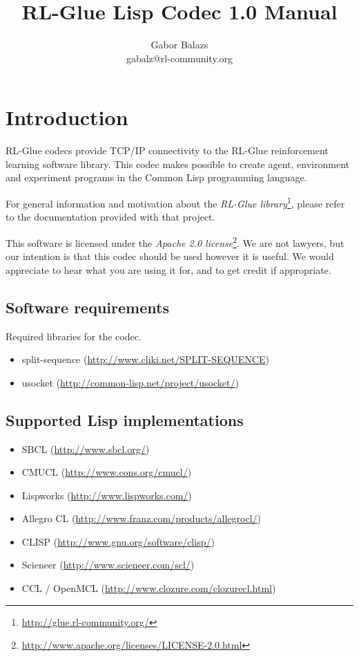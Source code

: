 \documentclass[11pt,a4paper,dvipdfm]{article}
\newcommand{\selfref}[1]{\href{#1}{#1}}
\newcommand{\footref}[2]{\textsl{#1}\footnote{\selfref{#2}}}
\begin{document}
\title{RL-Glue Lisp Codec 1.0 Manual}
\author{Gabor Balazs \\ gabalz@rl-community.org}
\date{}

\maketitle
\setcounter{tocdepth}{2}
\tableofcontents
\newpage


\section{Introduction}

RL-Glue codecs provide TCP/IP connectivity to the RL-Glue reinforcement
learning software library. This codec makes possible to create agent,
environment and experiment programs in the Common Lisp programming language.

For general information and motivation about the
\footref{RL-Glue library}{http://glue.rl-community.org/}, please refer to the
documentation provided with that project.

This software is licensed under the
\footref{Apache 2.0 license}{http://www.apache.org/licenses/LICENSE-2.0.html}.
We are not lawyers, but our intention is that this codec should be used however
it is useful. We would appreciate to hear what you are using it for, and to get
credit if appropriate.

\subsection{Software requirements}
\hypertarget{softreqs}{}

Required libraries for the codec.
\begin{itemize}
\item[] split-sequence (\selfref{http://www.cliki.net/SPLIT-SEQUENCE})
\item[] usocket (\selfref{http://common-lisp.net/project/usocket/})
\end{itemize}

\subsection{Supported Lisp implementations}

\begin{itemize}
\item[] SBCL (\selfref{http://www.sbcl.org/})
\item[] CMUCL (\selfref{http://www.cons.org/cmucl/})
\item[] Lispworks (\selfref{http://www.lispworks.com/})
\item[] Allegro CL (\selfref{http://www.franz.com/products/allegrocl/})
\item[] CLISP (\selfref{http://www.gnu.org/software/clisp/})
\item[] Scieneer (\selfref{http://www.scieneer.com/scl/})
\item[] CCL / OpenMCL (\selfref{http://www.clozure.com/clozurecl.html})
\end{itemize}
\end{document}
